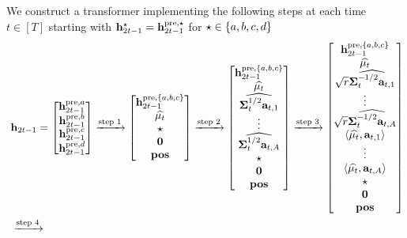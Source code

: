 We construct a transformer implementing the following steps at each time $t\in[T]$ starting with ${\mathbf h}^{\star}_{2t-1}={\mathbf h}^{{\mathrm{pre}},\star}_{2t-1}$ for $\star\in\{{a},{b},{c},{d}\}$ 
\begin{align}\label{eq:roadmap_ts}
   &~ \bh_{2t-1}=
    \begin{bmatrix}
    \bh_{2t-1}^{\pre,\parta} \\  \bh_{2t-1}^{\pre,\partb}\\  \bh_{2t-1}^{\pre,\partc}\\   \bh_{2t-1}^{\pre,\partd}
\end{bmatrix}
\xrightarrow{\text{step 1}}
   \begin{bmatrix}
    \bh_{2t-1}^{\pre,\{\parta,\partb,\partc\}} \\
        \widehat{\Tpsmean_t}\\ \star\\ \bzero \\\posv
\end{bmatrix}
\xrightarrow{\text{step 2}}
   \begin{bmatrix}
    \bh_{2t-1}^{\pre,\{\parta,\partb,\partc\}}\\\widehat{\Tpsmean_t} 
        \\
\widehat{\Tpscov_t^{1/2}\ba_{t,1}}
\\\vdots\\
         \widehat{\Tpscov_t^{1/2}\ba_{t,A}}\\
        \star\\ \bzero \\\posv
\end{bmatrix}
\xrightarrow{\text{step 3}}
   \begin{bmatrix}
    \bh_{2t-1}^{\pre,\{\parta,\partb,\partc\}}\\\widehat{\Tpsmean_t} 
        \\
 \sqrt{\Tpsparn}\widehat{\Tpscov_t^{-1/2}\ba_{t,1}}
\\\vdots\\
        \sqrt{\Tpsparn} \widehat{\Tpscov_t^{-1/2}\ba_{t,A}}\\
        \<\widehat{\Tpsmean_t},\ba_{t,1}\>\\\vdots\\
        \<\widehat{\Tpsmean_t},\ba_{t,A}\>
        \\
        \star\\ \bzero \\\posv
\end{bmatrix}
\\ &~\xrightarrow{\text{step 4}}

\end{align}
